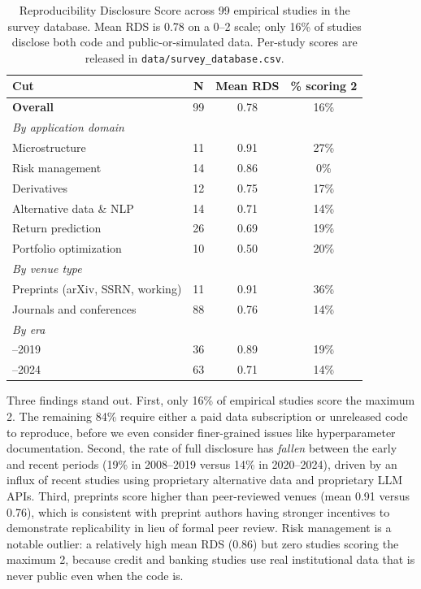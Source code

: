 \begin{table}[H]
\centering
\caption{Reproducibility Disclosure Score across 99 empirical studies in the survey database. Mean RDS is 0.78 on a 0--2 scale; only 16\% of studies disclose both code and public-or-simulated data. Per-study scores are released in \texttt{data/survey\_database.csv}.}
\label{tab:rds_distribution}
\small
\begin{tabular}{l c c c}
\toprule
\textbf{Cut} & \textbf{N} & \textbf{Mean RDS} & \textbf{\% scoring 2} \\
\midrule
\textbf{Overall}                            & 99 & 0.78 & 16\% \\[3pt]
\textit{By application domain}              &     &      &      \\
\quad Microstructure                        & 11  & 0.91 & 27\% \\
\quad Risk management                       & 14  & 0.86 & 0\%  \\
\quad Derivatives                           & 12  & 0.75 & 17\% \\
\quad Alternative data \& NLP               & 14  & 0.71 & 14\% \\
\quad Return prediction                     & 26  & 0.69 & 19\% \\
\quad Portfolio optimization                & 10  & 0.50 & 20\% \\[3pt]
\textit{By venue type}                      &     &      &      \\
\quad Preprints (arXiv, SSRN, working)      & 11  & 0.91 & 36\% \\
\quad Journals and conferences              & 88  & 0.76 & 14\% \\[3pt]
\textit{By era}                             &     &      &      \\
\quad 2008--2019                            & 36  & 0.89 & 19\% \\
\quad 2020--2024                            & 63  & 0.71 & 14\% \\
\bottomrule
\end{tabular}
\end{table}

Three findings stand out. First, only 16\% of empirical studies score the maximum 2. The remaining 84\% require either a paid data subscription or unreleased code to reproduce, before we even consider finer-grained issues like hyperparameter documentation. Second, the rate of full disclosure has \textit{fallen} between the early and recent periods (19\% in 2008--2019 versus 14\% in 2020--2024), driven by an influx of recent studies using proprietary alternative data and proprietary LLM APIs. Third, preprints score higher than peer-reviewed venues (mean 0.91 versus 0.76), which is consistent with preprint authors having stronger incentives to demonstrate replicability in lieu of formal peer review. Risk management is a notable outlier: a relatively high mean RDS (0.86) but zero studies scoring the maximum 2, because credit and banking studies use real institutional data that is never public even when the code is.

